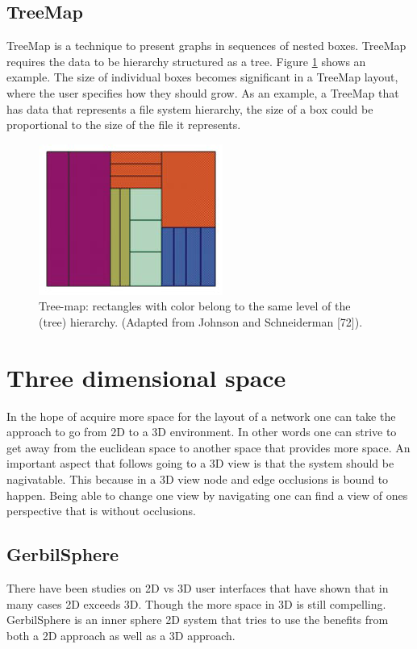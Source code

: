 \documentclass[a4paper,11pt]{kth-mag}
\begin{document}
\subsection{TreeMap}
TreeMap is a technique to present graphs in sequences of nested boxes\cite{herman00}. TreeMap requires the data to be hierarchy structured as a tree. Figure \ref{fig:tree_map_ex} shows an example. The size of individual boxes becomes significant in 
a TreeMap layout, where the user specifies how they should grow. As an example, a TreeMap that has data that represents a file system hierarchy, the size of a box could be proportional to the size of the file it represents.

\begin{figure}[!htbp]
	\centering
	\includegraphics{TreeMapEx}
	\caption{Tree-map: rectangles with color belong to the same level of the
(tree) hierarchy. (Adapted from Johnson and Schneiderman [72]).}
	\label{fig:tree_map_ex}
\end{figure}
\section{Three dimensional space}
In the hope of acquire more space for the layout of a network one can take the approach to go from 2D to a 3D environment. In other words one can strive to get away from the euclidean space to another space that provides more space.
 An important aspect that follows going to a 3D view is that the system should be nagivatable. This because in a 3D view node and edge occlusions is bound to happen. Being able to change one view by navigating one can find a 
 view of ones perspective that is without occlusions.
\subsection{GerbilSphere}
There have been studies on 2D vs 3D user interfaces that have shown that in many cases 2D exceeds 3D. Though the more space in 3D is still compelling. GerbilSphere is an inner sphere 2D system that tries to 
use the benefits from both a 2D approach as well as a 3D approach.
\end{document}
